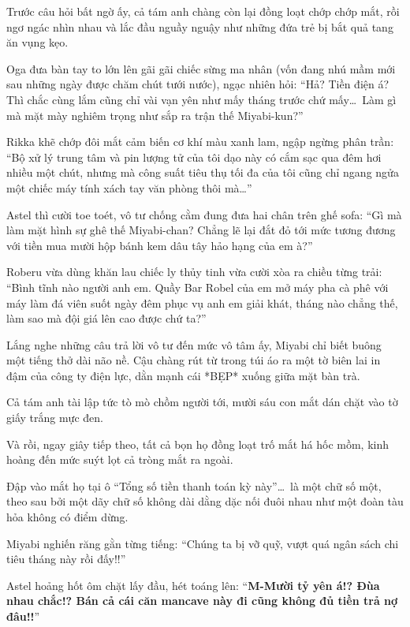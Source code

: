 \documentclass[../main.tex]{subfiles}
\begin{document}
Trước câu hỏi bất ngờ ấy, cả tám anh chàng còn lại đồng loạt chớp chớp mắt, rồi ngơ ngác nhìn nhau và lắc đầu nguầy nguậy như những đứa trẻ bị bắt quả tang ăn vụng kẹo.

Oga đưa bàn tay to lớn lên gãi gãi chiếc sừng ma nhân (vốn đang nhú mầm mới sau những ngày được chăm chút tưới nước), ngạc nhiên hỏi: ``Hả? Tiền điện á? Thì chắc cùng lắm cũng chỉ vài vạn yên như mấy tháng trước chứ mấy\dots\ Làm gì mà mặt mày nghiêm trọng như sắp ra trận thế Miyabi-kun?''

Rikka khẽ chớp đôi mắt cảm biến cơ khí màu xanh lam, ngập ngừng phân trần: ``Bộ xử lý trung tâm và pin lượng tử của tôi dạo này có cắm sạc qua đêm hơi nhiều một chút, nhưng mà công suất tiêu thụ tối đa của tôi cũng chỉ ngang ngửa một chiếc máy tính xách tay văn phòng thôi mà\dots''

Astel thì cười toe toét, vô tư chống cằm đung đưa hai chân trên ghế sofa: ``Gì mà làm mặt hình sự ghê thế Miyabi-chan? Chẳng lẽ lại đắt đỏ tới mức tương đương với tiền mua mười hộp bánh kem dâu tây hảo hạng của em à?''

Roberu vừa dùng khăn lau chiếc ly thủy tinh vừa cười xòa ra chiều từng trải: ``Bình tĩnh nào người anh em. Quầy Bar Robel của em mở máy pha cà phê với máy làm đá viên suốt ngày đêm phục vụ anh em giải khát, tháng nào chẳng thế, làm sao mà đội giá lên cao được chứ ta?''

Lắng nghe những câu trả lời vô tư đến mức vô tâm ấy, Miyabi chỉ biết buông một tiếng thở dài não nề. Cậu chàng rút từ trong túi áo ra một tờ biên lai in đậm của công ty điện lực, dằn mạnh cái *BẸP* xuống giữa mặt bàn trà.

Cả tám anh tài lập tức tò mò chồm người tới, mười sáu con mắt dán chặt vào tờ giấy trắng mực đen.


Và rồi, ngay giây tiếp theo, tất cả bọn họ đồng loạt trố mắt há hốc mồm, kinh hoàng đến mức suýt lọt cả tròng mắt ra ngoài.

Đập vào mắt họ tại ô ``Tổng số tiền thanh toán kỳ này''\dots\ là một chữ số một, theo sau bởi một dãy chữ số không dài dằng dặc nối đuôi nhau như một đoàn tàu hỏa không có điểm dừng.

Miyabi nghiến răng gằn từng tiếng: ``Chúng ta bị vỡ quỹ, vượt quá ngân sách chi tiêu tháng này rồi đấy!!''

Astel hoảng hốt ôm chặt lấy đầu, hét toáng lên: ``\textbf{M-Mười tỷ yên á!? Đùa nhau chắc!? Bán cả cái căn mancave này đi cũng không đủ tiền trả nợ đâu!!}''
\end{document}

